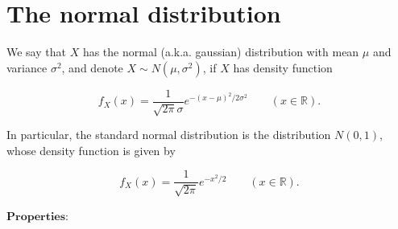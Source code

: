 \documentclass[11pt]{report}
\newcommand{\R}{\mathbb{R}}
\theoremstyle{plain}
\theoremstyle{definition}
\begin{document}
\section{The normal distribution}
\label{sec:normal-dist}
We say that $X$ has the normal (a.k.a. gaussian)
distribution with mean $\mu$ and variance $\sigma^2$,
and denote $X\sim N(\mu,\sigma^2)$, if $X$ has
density function

\[
f_X(x) = \frac{1}{\sqrt{2\pi} \sigma} e^{-(x-\mu)^2/2\sigma^2} \qquad (x\in\R).
\]

In particular, the standard normal distribution is
the distribution $N(0,1)$, whose density function is
given by

\[
f_X(x) = \frac{1}{\sqrt{2\pi}} e^{-x^2/2} \qquad (x\in\R).
\]

$\textbf{Properties:}$
\end{document}
